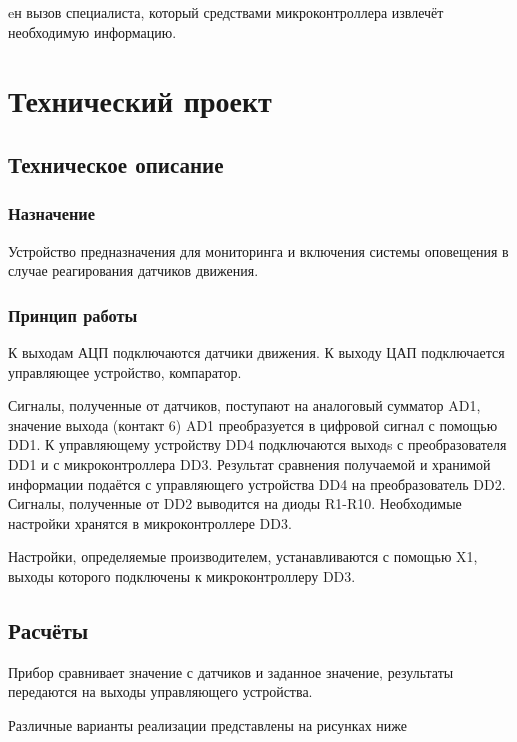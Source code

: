eн вызов специалиста, который средствами микроконтроллера извлечёт необходимую информацию.\chapter{Технический проект}
	\section{Техническое описание}
		\subsection{Назначение}
				Устройство предназначения для мониторинга и включения системы оповещения в случае
			реагирования датчиков движения.
		\subsection{Принцип работы}
				К выходам АЦП подключаются датчики движения. К выходу ЦАП подключается
			управляющее устройство, компаратор.

				Сигналы, полученные от датчиков, поступают на аналоговый сумматор AD1, значение
			выхода (контакт 6) AD1 преобразуется в цифровой сигнал с помощью DD1. К
			управляющему устройству DD4 подключаются выходs с преобразователя DD1 и с микроконтроллера
			DD3. Результат сравнения получаемой и хранимой информации подаётся с управляющего
			устройства DD4 на преобразователь DD2. Сигналы, полученные от DD2 выводится на диоды
			R1-R10. Необходимые настройки хранятся в микроконтроллере DD3.

				Настройки, определяемые производителем, устанавливаются с помощью X1, выходы
			которого подключены к микроконтроллеру DD3.
	\section{Расчёты}
			Прибор сравнивает значение с датчиков и заданное значение, результаты передаются на
		выходы управляющего устройства.

			Различные варианты реализации представлены на рисунках ниже
